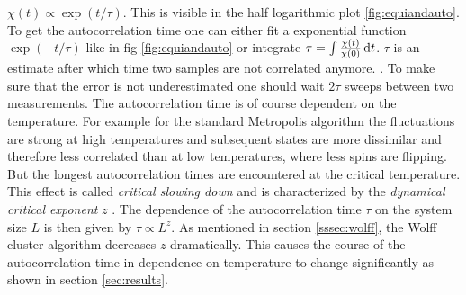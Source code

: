         \(\chi(t) \propto \exp(t/\tau)\). This is visible in the half
        logarithmic plot \ref{fig:equiandauto}.
        To get the autocorrelation time one can either fit a exponential
        function \(\exp(-t/\tau)\) like in fig \ref{fig:equiandauto}
        or integrate \(\tau = \int \frac{\chi(t)}{\chi(0)} \,\mathrm{d} t\).
        \(\tau\) is an estimate after which time two samples are not
        correlated anymore. \cite[S. ??]{NewmanBarkema1999} \cite[S. 150f]{Katzgraber2011}.
        To make sure that the error is not underestimated one should wait
        \(2\tau\) sweeps between two measurements.
        The autocorrelation time is of course dependent on the temperature.
        For example for the standard Metropolis algorithm the fluctuations
        are strong at high temperatures and subsequent
        states are more dissimilar and therefore less correlated than at low
        temperatures, where less spins are flipping. But the longest
        autocorrelation times are encountered at the critical temperature.
        This effect is called \emph{critical slowing down} and is
        characterized by the \emph{dynamical critical exponent} \(z\)
        \cite{SwendsenWang1987}. The dependence of the autocorrelation time
        \(\tau\) on the system size \(L\) is then given by \(\tau \propto L^z\).
        As mentioned in section \ref{sssec:wolff}, the Wolff cluster algorithm
        decreases \(z\) dramatically. This causes the course of the autocorrelation
        time in dependence on temperature to change significantly as shown in
        section \ref{sec:results}.
